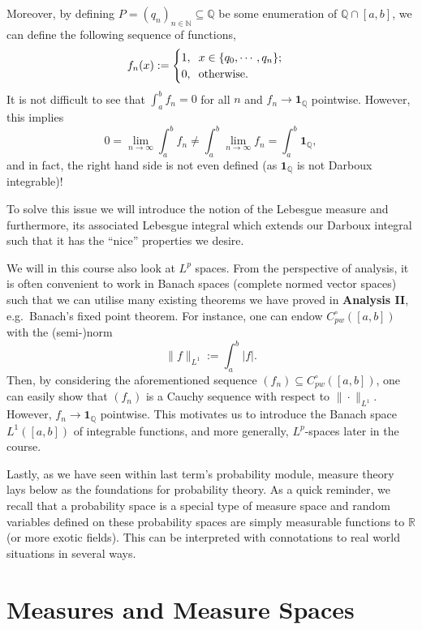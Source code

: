 \documentclass[
]{article}
\theoremstyle{definition}
\theoremstyle{definition}
\begin{document}
Moreover, by defining
\(P = (q_n)_{n \in \mathbb{N}} \subseteq \mathbb{Q}\) be some
enumeration of \(\mathbb{Q} \cap [a, b]\), we can define the following
sequence of functions, \[f_n(x) := 
  \begin{cases}
    1, \hspace{2mm} x \in \{q_0, \cdots, q_n\};\\
    0, \hspace{2mm} \text{otherwise}. 
  \end{cases}\] It is not difficult to see that \(\int_a^b f_n = 0\) for
all \(n\) and \(f_n \to \mathbf{1}_\mathbb{Q}\) pointwise. However, this
implies
\[0 = \lim_{n \to \infty} \int_a^b f_n \neq \int_a^b \lim_{n \to \infty} f_n = 
  \int_a^b \mathbf{1}_\mathbb{Q},\] and in fact, the right hand side is
not even defined (as \(\mathbf{1}_\mathbb{Q}\) is not Darboux
integrable)!

To solve this issue we will introduce the notion of the Lebesgue measure
and furthermore, its associated Lebesgue integral which extends our
Darboux integral such that it has the ``nice'' properties we desire.

We will in this course also look at \(L^p\) spaces. From the perspective
of analysis, it is often convenient to work in Banach spaces (complete
normed vector spaces) such that we can utilise many existing theorems we
have proved in \textbf{Analysis II}, e.g.~Banach's fixed point theorem.
For instance, one can endow \(C_{pw}^\circ([a, b])\) with the
(semi-)norm \[\|f\|_{L^1} := \int_a^b \left| f \right|. \] Then, by
considering the aforementioned sequence
\((f_n) \subseteq C_{pw}^\circ([a, b])\), one can easily show that
\((f_n)\) is a Cauchy sequence with respect to \(\| \cdot \|_{L^1}\).
However, \(f_n \to \mathbf{1}_\mathbb{Q}\) pointwise. This motivates us
to introduce the Banach space \(L^1([a, b])\) of integrable functions,
and more generally, \(L^p\)-spaces later in the course.

Lastly, as we have seen within last term's probability module, measure
theory lays below as the foundations for probability theory. As a quick
reminder, we recall that a probability space is a special type of
measure space and random variables defined on these probability spaces
are simply measurable functions to \(\mathbb{R}\) (or more exotic
fields). This can be interpreted with connotations to real world
situations in several ways.

\newpage

\hypertarget{measures-and-measure-spaces}{%
\section{Measures and Measure
Spaces}\label{measures-and-measure-spaces}}
\end{document}
